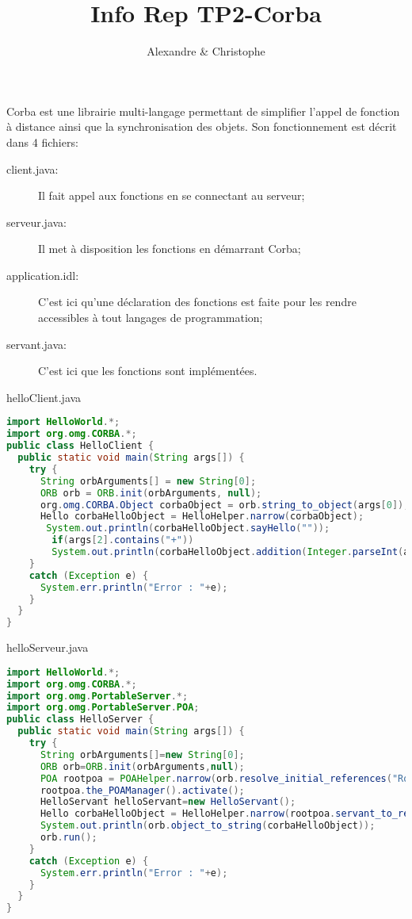 \documentclass{article}
\title{Info Rep TP2-Corba}
\author{Alexandre \bsc{Brehmer} \& Christophe \bsc{Cluizel}}
\begin{document}
\maketitle
Corba est une librairie multi-langage permettant de simplifier l'appel de fonction à distance ainsi que la synchronisation des objets. Son fonctionnement est décrit dans 4 fichiers:
\begin{description}
\item [client.java:] Il fait appel aux fonctions en se connectant au serveur;
\item [serveur.java:] Il met à disposition les fonctions en démarrant Corba;
\item [application.idl:] C'est ici qu'une déclaration des fonctions est faite pour les rendre accessibles à tout langages de programmation;
\item [servant.java:] C'est ici que les fonctions sont implémentées.
\end{description}

helloClient.java
\begin{lstlisting}[language=JAVA]
import HelloWorld.*;
import org.omg.CORBA.*;
public class HelloClient {
  public static void main(String args[]) {
    try {
      String orbArguments[] = new String[0];
      ORB orb = ORB.init(orbArguments, null);
      org.omg.CORBA.Object corbaObject = orb.string_to_object(args[0]);
      Hello corbaHelloObject = HelloHelper.narrow(corbaObject);
       System.out.println(corbaHelloObject.sayHello(""));
        if(args[2].contains("+"))
		System.out.println(corbaHelloObject.addition(Integer.parseInt(args[1]),Integer.parseInt(args[3])));
    }
    catch (Exception e) {
      System.err.println("Error : "+e);
    }
  }
}
\end{lstlisting}

helloServeur.java
\begin{lstlisting}[language=JAVA]
import HelloWorld.*;
import org.omg.CORBA.*;
import org.omg.PortableServer.*;
import org.omg.PortableServer.POA;
public class HelloServer {
  public static void main(String args[]) {
    try {
      String orbArguments[]=new String[0];
      ORB orb=ORB.init(orbArguments,null);
      POA rootpoa = POAHelper.narrow(orb.resolve_initial_references("RootPOA"));
      rootpoa.the_POAManager().activate();
      HelloServant helloServant=new HelloServant();
      Hello corbaHelloObject = HelloHelper.narrow(rootpoa.servant_to_reference(helloServant));
      System.out.println(orb.object_to_string(corbaHelloObject));
      orb.run();
    }
    catch (Exception e) {
      System.err.println("Error : "+e);
    }
  }
}
\end{lstlisting}
\end{document}
